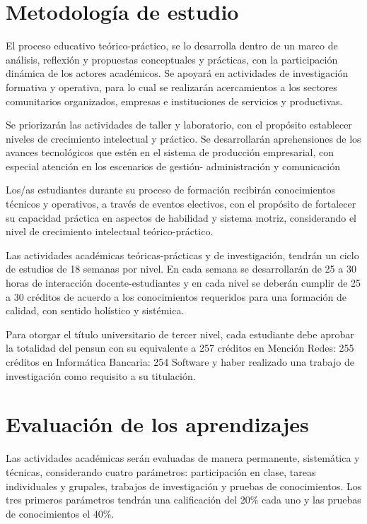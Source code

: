 \section{Metodología de estudio}
El proceso educativo teórico-práctico, se lo desarrolla dentro de un marco de análisis, 
reflexión y propuestas conceptuales y prácticas, con la participación dinámica de los 
actores académicos. Se apoyará en actividades de investigación formativa y operativa, 
para lo cual se realizarán acercamientos a los sectores comunitarios organizados, 
empresas e instituciones de servicios  y productivas. 

Se priorizarán las actividades de taller y laboratorio, con el propósito 
establecer niveles de crecimiento intelectual y práctico. Se desarrollarán 
aprehensiones de los avances tecnológicos que estén en el sistema de producción 
empresarial, con  especial atención en los escenarios de   gestión- administración 
y comunicación  

Los/as estudiantes durante su proceso de formación recibirán conocimientos 
técnicos y operativos, a través de eventos  electivos, con el propósito de 
fortalecer su capacidad práctica en aspectos de habilidad y sistema motriz, 
considerando el nivel de crecimiento intelectual teórico-práctico. 

Las actividades académicas teóricas-prácticas y de investigación, tendrán un 
ciclo de estudios de 18 semanas por nivel. En cada semana se desarrollarán de 
25 a 30 horas de interacción docente-estudiantes y en  cada nivel se deberán 
cumplir de 25 a 30 créditos de acuerdo a los conocimientos requeridos para 
una formación de calidad, con sentido holístico y sistémica. 

Para otorgar el título universitario de tercer nivel, cada estudiante debe 
aprobar la totalidad del pensun con su equivalente a 257 créditos  en 
Mención Redes: 255 créditos en Informática Bancaria: 254  Software y 
haber realizado una trabajo de investigación como requisito a su titulación. 

\section{Evaluación de los aprendizajes}
Las actividades académicas serán evaluadas de manera permanente, sistemática y 
técnicas, considerando cuatro parámetros: participación en clase, tareas individuales 
y grupales, trabajos de investigación y pruebas de conocimientos.  Los tres primeros 
parámetros tendrán una calificación del 20\% cada uno y las pruebas de conocimientos 
el 40\%.  

